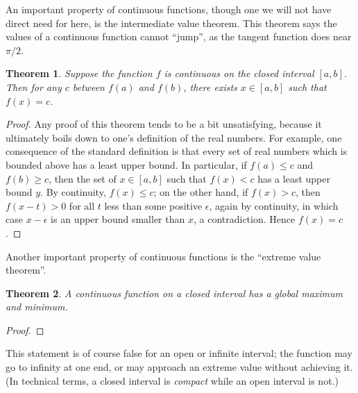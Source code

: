 \documentclass[12pt]{report}
\newtheorem{theorem}{Theorem}
\numberwithin{exc}{section}
\begin{document}
An important property of continuous functions, though one we will not 
have direct need for here, is the intermediate 
value theorem. This theorem says
the values of a continuous function cannot ``jump'', as the tangent 
function does near $\pi/2$. 
\begin{theorem}
Suppose the function $f$ is continuous on the closed interval 
$[a,b]$. Then for any $c$ between $f(a)$ and $f(b)$, there exists $x 
\in [a,b]$ such that $f(x) = c$.
\end{theorem}
\begin{proof}
Any proof of this theorem tends to be a bit unsatisfying, because it
ultimately boils down to one's definition of the real numbers. For
example, one consequence of the standard definition is that every set
of real numbers which is bounded above has a least upper bound.  In
particular, if $f(a) \leq c$ and $f(b) \geq c$, then the set of $x \in
[a,b]$ such that $f(x) < c$ has a least upper bound $y$. By continuity,
$f(x) \leq c$; on the other hand, if $f(x) > c$, then $f(x-t) > 0$
for all $t$ less than some positive $\epsilon$, again by continuity, in
which case $x-\epsilon$ is an upper bound smaller than $x$, a contradiction.
Hence $f(x) = c$.
\end{proof}

Another important property of continuous functions is the ``extreme 
value theorem''.
\begin{theorem}
A continuous function on a closed interval has a global maximum and 
minimum.
\end{theorem}
\begin{proof}
\end{proof}
This statement is of course false for an open or infinite interval; 
the function may go to infinity at one end, or may approach an extreme 
value without achieving it. (In technical terms, a closed interval is
\emph{compact} while an open interval is not.)
\end{document}
